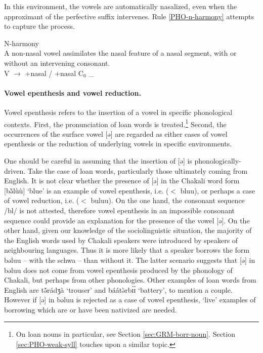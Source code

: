 In this environment, the vowels are  automatically nasalized, even when the
approximant of the perfective suffix intervenes. Rule \ref{PHO-n-harmony}
attempts to capture the process.

\begin{Rule}\label{PHO-n-harmony}{N-harmony}\\
A non-nasal vowel assimilates the nasal feature of a nasal segment, with or
without an intervening consonant. \\
 V $\rightarrow$  {\ob}{\sc +nasal}{\cb} /  {\ob}{\sc +nasal}{\cb} C$_0$  \_  
\end{Rule}




\paragraph{Vowel epenthesis and vowel reduction.}
\label{sec:epenthesis}


Vowel epenthesis refers to the insertion of a vowel in specific phonological contexts. First,  the pronunciation of loan words is treated.\footnote{On  loan nouns in particular, see Section \ref{sec:GRM-borr-noun}. Section \ref{sec:PHO-weak-syll} touches upon a similar topic.}  Second,  the occurrences of the surface vowel [{ə}] are regarded as  either cases of vowel epenthesis or the reduction of  underlying vowels in specific environments. 

One should be careful in assuming that the insertion of  [{ə}] is phonologically-driven.  Take the case of loan words, particularly those ultimately coming  from  English. It is not clear whether the presence of [{ə}] in the Chakali word form [{bə̆̀lùù}] `blue'  is an example of vowel epenthesis, i.e.  ($<$ {\sls bluu}),  or perhaps a case of vowel reduction, i.e.  ($<$ {\sls buluu}).  On the one hand, the  consonant sequence  /bl/ is not attested, therefore  vowel epenthesis in an impossible consonant sequence  could  provide an explanation for the presence of  the vowel [{ə}].  On the other hand, given our knowledge of the sociolinguistic situation,  the majority of the English words used by Chakali speakers   were introduced by speakers of neighbouring languages. Thus it is more likely that a speaker borrows the form {\sls bəluu} -- with the schwa --  than without it. The latter scenario suggests that  [{ə}] in {\sls bəluu} does not come from vowel epenthesis produced by the phonology of Chakali, but perhaps from other phonologies.  Other examples of loan words from English are {\sls tə̆́rádʒà} `trouser' and  {\sls báátə̀rbɪ́ɪ́} `battery', to mention a couple. However if   [{ə}]  in {\sls bəluu} is rejected as a case of vowel epenthesis, `live' examples of borrowing  which are or have been nativized are needed.  

